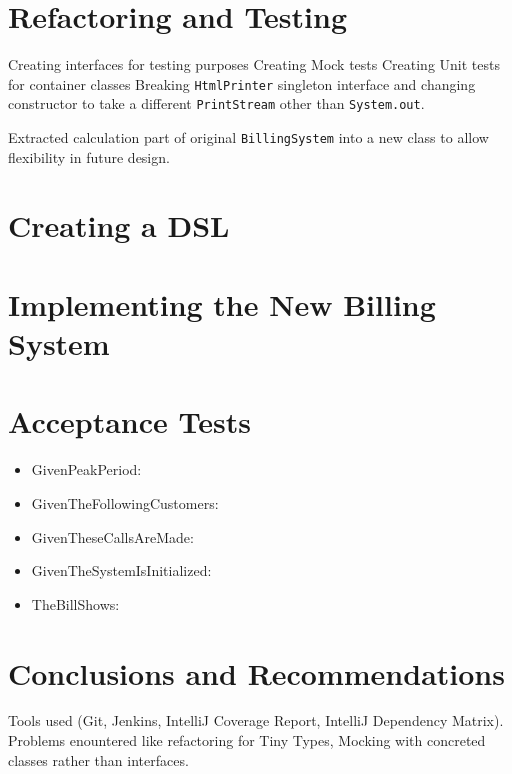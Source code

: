\documentclass[a4paper,12pt,oneside,final]{article}
\newenvironment{changemargin}[2]{\begin{list}{}{%
\setlength{\topsep}{0pt}%
\setlength{\leftmargin}{0pt}%
\setlength{\rightmargin}{0pt}%
\setlength{\listparindent}{\parindent}%
\setlength{\itemindent}{\parindent}%
\setlength{\parsep}{0pt plus 1pt}%
\addtolength{\leftmargin}{#1}%
\addtolength{\rightmargin}{#2}%
}\item }{\end{list}}
\begin{document}
\section{Refactoring and Testing} %
Creating interfaces for testing purposes
Creating Mock tests
Creating Unit tests for container classes
Breaking \verb+HtmlPrinter+ singleton interface and changing constructor to take a different \verb+PrintStream+ other than \verb+System.out+.

Extracted calculation part of original \verb+BillingSystem+ into a new class to allow flexibility in future design.

\section{Creating a DSL} %

\section{Implementing the New Billing System}  %




\section{Acceptance Tests} %
\begin{itemize}
\item GivenPeakPeriod: 
\item GivenTheFollowingCustomers: 
\item GivenTheseCallsAreMade:
\item GivenTheSystemIsInitialized:
\item TheBillShows:
\end{itemize}


\section{Conclusions and Recommendations} %
Tools used (Git, Jenkins, IntelliJ Coverage Report, IntelliJ Dependency Matrix).  Problems enountered like refactoring for Tiny Types, Mocking with concreted classes rather than interfaces.
\end{document}

